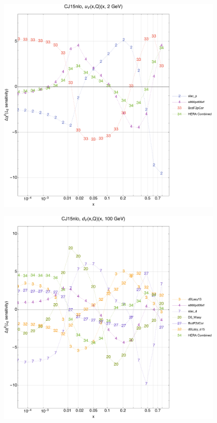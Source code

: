 \documentclass[10pt,aps,prd,floatfix,titlepage]{revtex4}
\begin{document}
\begin{figure}
\includegraphics[width=\textwidth,height=0.44\textheight,keepaspectratio]{2/rat_ifl1_CJ15nlo_L2_q2_Sf_2.pdf}
\caption{}
\end{figure}
\clearpage
\begin{figure}
\includegraphics[width=\textwidth,height=0.44\textheight,keepaspectratio]{2/rat_ifl2_CJ15nlo_L2_q100_Sf_2.pdf}
\caption{}
\end{figure}
\end{document}
